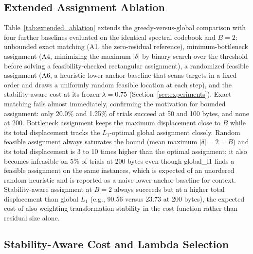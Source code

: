\documentclass[preprint,12pt]{elsarticle}
\theoremstyle{plain}
\begin{document}
\begin{table}[!t]
\centering
\caption{Dense Versus Aggregated Flow: Cost Agreement and Running Time}
\label{tab:formulation_comparison}

\end{table}

\subsection{Extended Assignment Ablation}

Table~\ref{tab:extended_ablation} extends the greedy-versus-global comparison
with four further baselines evaluated on the identical spectral codebook and
$B=2$: unbounded exact matching (A1, the zero-residual reference), minimum-bottleneck
assignment (A4, minimizing the maximum $|\delta|$ by binary search over the
threshold before solving a feasibility-checked rectangular assignment), a
randomized feasible assignment (A6, a heuristic lower-anchor baseline that
scans targets in a fixed order and draws a uniformly random feasible location
at each step), and the stability-aware cost at its frozen $\lambda=0.75$
(Section~\ref{sec:experiments}). Exact matching fails almost immediately, confirming the
motivation for bounded assignment: only 20.0\% and 1.25\% of trials succeed at
50 and 100 bytes, and none at 200. Bottleneck assignment keeps the maximum
displacement close to $B$ while its total displacement tracks the $L_1$-optimal
global assignment closely. Random feasible assignment always saturates the
bound (mean maximum $|\delta|=2=B$) and its total displacement is 3 to 10
times higher than the optimal assignment; it also becomes infeasible on 5\% of
trials at 200 bytes even though global\_l1 finds a feasible assignment on the
same instances, which is expected of an unordered random heuristic and is
reported as a naive lower-anchor baseline for context.
Stability-aware assignment at $B=2$ always succeeds but at a higher total
displacement than global $L_1$ (e.g., 90.56 versus 23.73 at 200 bytes), the
expected cost of also weighting transformation stability in the cost
function rather than residual size alone.

\begin{table}[!t]
\centering
\caption{Extended Assignment Ablation at $B=2$}
\label{tab:extended_ablation}
\resizebox{\linewidth}{!}{}
\end{table}

\subsection{Stability-Aware Cost and Lambda Selection}
\end{document}
